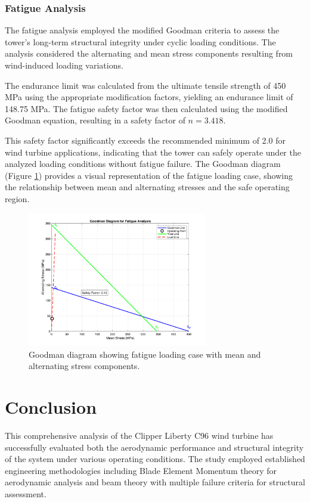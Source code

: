 \documentclass[11pt]{article}
\begin{document}
\subsubsection{Fatigue Analysis}

The fatigue analysis employed the modified Goodman criteria to assess the tower's long-term structural integrity under cyclic loading conditions. The analysis considered the alternating and mean stress components resulting from wind-induced loading variations.

The endurance limit was calculated from the ultimate tensile strength of 450 MPa using the appropriate modification factors, yielding an endurance limit of 148.75 MPa. The fatigue safety factor was then calculated using the modified Goodman equation, resulting in a safety factor of $n = 3.418$.

This safety factor significantly exceeds the recommended minimum of 2.0 for wind turbine applications, indicating that the tower can safely operate under the analyzed loading conditions without fatigue failure. The Goodman diagram (Figure \ref{fig:goodman}) provides a visual representation of the fatigue loading case, showing the relationship between mean and alternating stresses and the safe operating region.

\begin{figure}[H]
  \centering
  \includegraphics[width=0.7\textwidth]{../../PNGS/Goodman_Diagram_Analysis.png}
  \caption{Goodman diagram showing fatigue loading case with mean and alternating stress components.}
  \label{fig:goodman}
\end{figure} 

\section{Conclusion}

This comprehensive analysis of the Clipper Liberty C96 wind turbine has successfully evaluated both the aerodynamic performance and structural integrity of the system under various operating conditions. The study employed established engineering methodologies including Blade Element Momentum theory for aerodynamic analysis and beam theory with multiple failure criteria for structural assessment.
\end{document}
